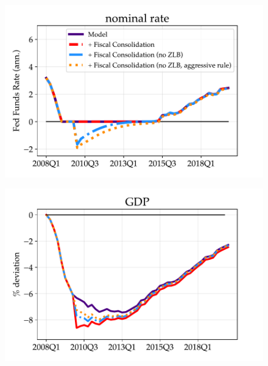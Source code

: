 \begin{figure}[t!] %
\centering
\begin{minipage}{0.51\textwidth}
\includegraphics[scale=.57]{text/chapter1/Figures/Fiscal_Consolidation_CounterFactual/FedFunds_FC_no_ZLB_lower}
 \label{fig:a}
\end{minipage}\hspace*{\fill}
\begin{minipage}{0.51\textwidth}
\includegraphics[scale=.57]{text/chapter1/Figures/Fiscal_Consolidation_CounterFactual/GDP_CounterFactual_Fiscal_Consolidation_no_ZLB_lower}
 \label{fig:b}
\end{minipage}


\end{figure}
